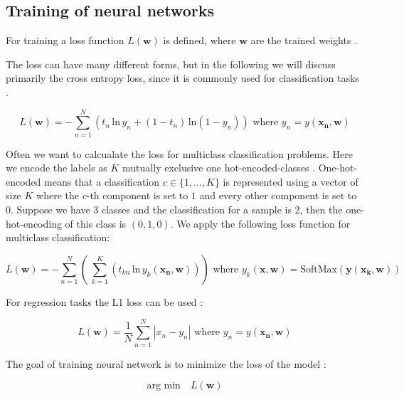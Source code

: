 \documentclass[draft,final,oneside]{vutinfth} %
\begin{document}
\subsection{Training of neural networks} \label{nntrain}

For training a loss function $L(\boldsymbol{w})$ is defined, where $\boldsymbol{w}$ are the trained weights \cite{Goodfellow-et-al-2016}.

The loss can have many different forms, but in the following we will discuss primarily the cross entropy loss, since it is commonly used for classification tasks \cite{dlvc}.

\begin{equation}
L(\boldsymbol{w}) = -\sum_{n=1}^N \left( t_n\,\text{ln}\, y_n + (1 - t_n)\,\text{ln}(1 - y_n)\right) \text{ where } 
y_n = y(\boldsymbol{x_n}, \boldsymbol{w})
\end{equation}

Often we want to calcualate the loss for multiclass classification problems. Here we encode the labels as $K$ mutually exclusive one hot-encoded-classes \cite{dlvc}. One-hot-encoded means that a classification $c \in \{1, ..., K\}$ is represented using a vector of size $K$ where the $c$-th component is set to $1$ and every other component is set to $0$. Suppose we have 3 classes and the classification for a sample is 2, then the one-hot-encoding of this class is $(0, 1, 0)$. We apply the following loss function for multiclass classification:

\begin{equation}
L(\boldsymbol{w}) = -\sum_{n=1}^N \left(\,\sum_{k=1}^K \left(t_{kn}\,\text{ln}\,y_k(\boldsymbol{x_n},\boldsymbol{w})\right)\right) \text{ where } y_k(\boldsymbol{x}, \boldsymbol{w}) = \text{SoftMax}(\boldsymbol{y}(\boldsymbol{x_k}, \boldsymbol{w}))
\end{equation}

For regression tasks the L1 loss can be used \cite{accuracy}:

\begin{equation}
L(\boldsymbol{w}) = \dfrac{1}{N} \sum_{n=1}^N |x_n - y_n| \text{ where } 
y_n = y(\boldsymbol{x_n}, \boldsymbol{w})
\end{equation}

The goal of training neural network is to minimize the loss of the model \cite{dlvc}:

\begin{equation}
\text{arg min}\quad L(\boldsymbol{w})
\end{equation}
\end{document}
